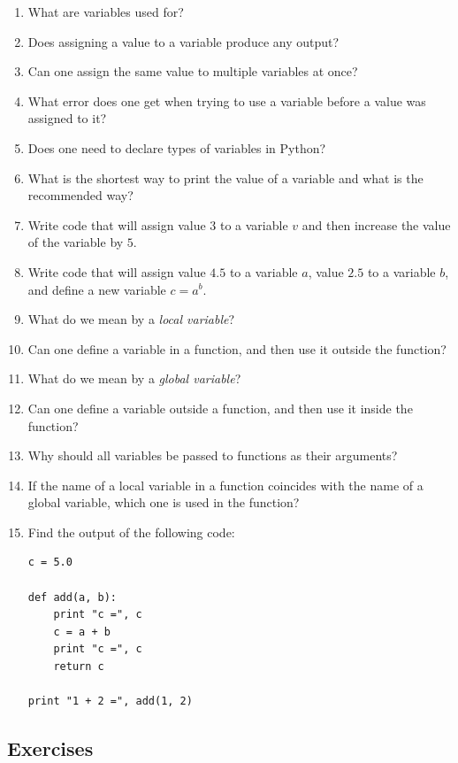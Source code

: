 \documentclass[article,A4,12pt]{llncs}
\begin{document}
\begin{enumerate}
\item What are variables used for?
\item Does assigning a value to a variable produce any output?
\item Can one assign the same value to multiple variables at once? 
\item What error does one get when trying to use a variable before a value was assigned to it?
\item Does one need to declare types of variables in Python?
\item What is the shortest way to print the value of a variable and what is the 
      recommended way?
\item Write code that will assign value $3$ to a variable $v$ and then increase the value of 
      the variable by $5$.
\item Write code that will assign value $4.5$ to a variable $a$, value $2.5$ to a variable 
      $b$, and define a new variable $c = a^b$. 
\item What do we mean by a {\em local variable}?
\item Can one define a variable in a function, and then use it outside the function?
\item What do we mean by a {\em global variable}?
\item Can one define a variable outside a function, and then use it inside the function? 
\item Why should all variables be passed to functions as their arguments?
\item If the name of a local variable in a function coincides with the name of a global variable,
      which one is used in the function? 
\item Find the output of the following code:
\begin{verbatim}
c = 5.0

def add(a, b):
    print "c =", c
    c = a + b
    print "c =", c
    return c

print "1 + 2 =", add(1, 2)
\end{verbatim}
\end{enumerate}

\subsection{Exercises}
\end{document}
